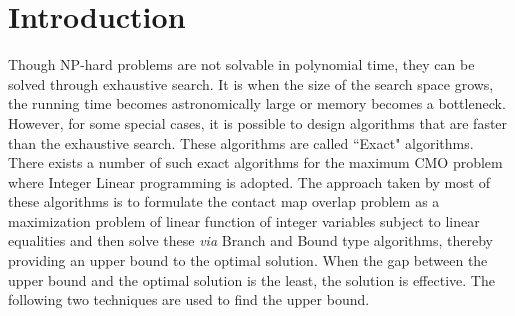 \section{Introduction}
Though NP-hard problems are not solvable in polynomial time, they can be solved through exhaustive search. It is when the size of the search space grows, the running time becomes astronomically large or memory becomes a bottleneck. However, for some special cases, it is possible to design algorithms that are faster than the exhaustive search. These algorithms are called ``Exact" algorithms. There exists a number of such exact algorithms for the maximum CMO problem where Integer Linear programming is adopted. The approach taken by most of these algorithms is to formulate the contact map overlap problem as a maximization problem of linear function of integer variables subject to linear equalities and then solve these \emph{via} Branch and Bound type algorithms, thereby providing an upper bound to the optimal solution. When the gap between the upper bound and the optimal solution is the least, the solution is effective. The following two techniques are used to find the upper bound.
